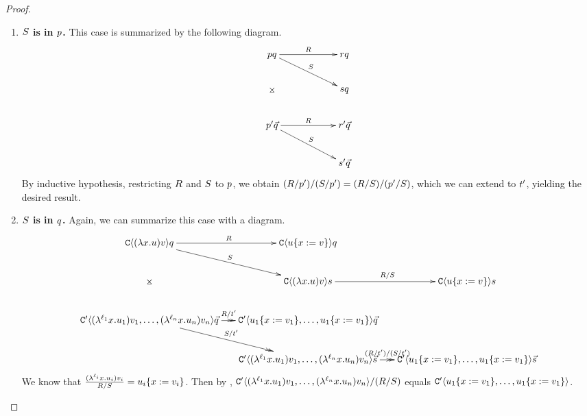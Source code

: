 \begin{proof}
\begin{enumerate}
\begin{enumerate}
\begin{enumerate}
          \item {\bf $S$ is in $p$.} This case is summarized by the following diagram.
            \[
            \xymatrix@C=2cm{
              \tmfive \tmsix
                \ar@{->}[r]^{\redex} \ar@{->}[rd]^{\redextwo} \ar@{}[dd]|*=0[@]{\rtimes}
                  & \tmfour \tmsix \\
                & \tmtwo \tmsix \\
                \ar@{->}[r]^{\redex} \ar@{->}[rd]^{\redextwo}
              \tmfive' \ls{\tmsix}
                  & \tmfour' \ls{\tmsix} \\
                & \tmtwo' \ls{\tmsix} \\
              }
            \]
            By inductive hypothesis, restricting $R$ and $S$ to $p$, we obtain
            $(R / p') / (S / p') = (R / S) / (p' / S)$,
            which we can extend to $t'$, yielding the desired result.
          \item {\bf $S$ is in $q$.} Again, we can summarize this case with a diagram.
            {\tiny
            \[
              \xymatrix@C=.5cm{
              \conof{(\lam{\var}{\tmthree}) \tmthreevariant} \tmsix
                \ar@{->}[r]^{\redex} \ar@{->}[rd]^{\redextwo} \ar@{}[dd]|*=0[@]{\rtimes}
                  & \conof{\subs{\tmthree}{\var}{\tmthreevariant}} \tmsix  & \\
                & \conof{(\lam{\var}{\tmthree}) \tmthreevariant} \tmtwo \ar@{->}[r]^{\redex / \redextwo}
                    & \conof{\subs{\tmthree}{\var}{\tmthreevariant}} \tmtwo \\
                \ar@{->>}[r]^{\redex / \tm'} \ar@{->>}[rd]^{\redextwo / \tm'}
              \contwoof{(\lamp{\lab_1}{\var}{\tmthree_1}) \tmthreevariant_1, \hdots, (\lamp{\lab_n}{\var}{\tmthree_n}) \tmthreevariant_n} \ls{\tmsix}
                  & \contwoof{\subs{\tmthree_1}{\var}{\tmthreevariant_1}, \hdots, \subs{\tmthree_1}{\var}{\tmthreevariant_1}} \ls{\tmsix} & \\
                & \contwoof{(\lamp{\lab_1}{\var}{\tmthree_1}) \tmthreevariant_1, \hdots, (\lamp{\lab_n}{\var}{\tmthree_n}) \tmthreevariant_n} \ls{\tmtwo} \ar@{->>}[r]^{(\redex / \tm') / (\redextwo / \tm')}
                  & \contwoof{\subs{\tmthree_1}{\var}{\tmthreevariant_1}, \hdots, \subs{\tmthree_1}{\var}{\tmthreevariant_1}} \ls{\tmtwo} \\
              }
            \]
            }
            We know that $\frac{(\lambda^{\ell_i} x. u_i) v_i}{R / S}
             = u_i\{x := v_i\}$.
            Then by ,
            $\mathtt{C}'\langle(\lambda^{\ell_1} x. u_1) v_1, \hdots, (\lambda^{\ell_n} x. u_n) v_n\rangle / (R / S)$ equals
            $\mathtt{C}'\langle u_1\{x := v_1\}, \hdots, u_1\{x := v_1\}\rangle$.


\end{enumerate}
\end{enumerate}
\end{enumerate}
\end{proof}
